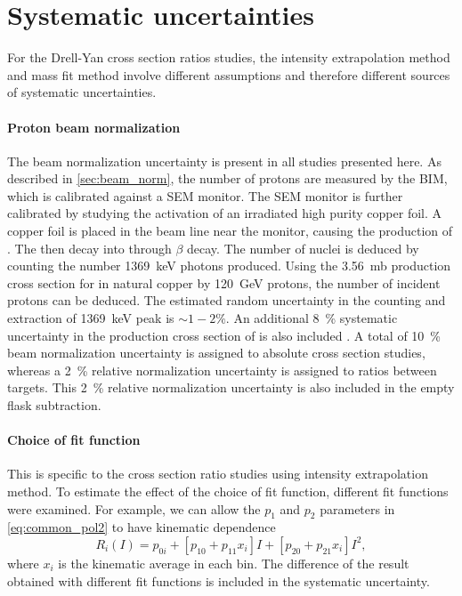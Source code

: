 \documentclass[../main.tex]{subfiles}
\begin{document}
\section{Systematic uncertainties}
For the Drell-Yan cross section ratios studies, the intensity extrapolation method and mass fit
method involve different assumptions and therefore different sources of systematic uncertainties.
\paragraph{Proton beam normalization}
The beam normalization uncertainty is present in all studies presented here.
As described in \cref{sec:beam_norm}, the number of protons are measured by the BIM, which is
calibrated against a SEM monitor. The SEM monitor is further calibrated by studying the activation of
an irradiated high purity copper foil. A copper foil is placed in the beam line near the monitor,
causing the production of . The  then decay into  through $\beta$
decay. The number of   nuclei is deduced by counting the number \SI{1369}{\keV} photons
produced. Using the \SI{3.56}{\milli\barn} production cross section for  in natural
copper  by \SI{120}{\GeV} protons, the number of incident protons can be deduced. The estimated
random uncertainty in the counting and extraction of \SI{1369}{\keV} peak is $\sim 1-2\%$.
An additional \SI{8}{\percent} systematic uncertainty in the production cross section of 
is also included \cite{docdb-457,docdb-7708}.
A total of \SI{10}{\percent} beam normalization uncertainty is assigned to absolute cross
section studies, whereas a \SI{2}{\percent} relative normalization uncertainty is assigned to ratios between
targets. This \SI{2}{\percent} relative normalization uncertainty is also included in the empty flask
subtraction.

\paragraph{Choice of fit function}
This is specific to the cross section ratio studies using intensity extrapolation method.
To estimate the effect of the choice of fit function, different fit functions were examined.
For example, we can allow the $p_1$ and $p_2$ parameters in \cref{eq:common_pol2} to have kinematic
dependence
\begin{equation}
	R_i \left(I\right) = p_{0i} + \left[p_{10}+p_{11}x_i\right] I + \left[p_{20}+p_{21}x_i\right] I^2,
\end{equation}
where $x_i$ is the kinematic average in each bin. The difference of the result obtained with different fit
functions is included in the systematic uncertainty.
\end{document}

